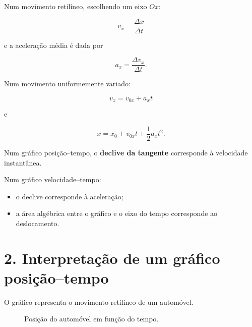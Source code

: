 \documentclass[11pt,a4paper]{article}
\begin{document}
	\begin{recorda}
		
		Num movimento retilíneo, escolhendo um eixo $Ox$:
		
		\[
		v_x=\frac{\Delta x}{\Delta t}
		\]
		
		e a aceleração média é dada por
		
		\[
		a_x=\frac{\Delta v_x}{\Delta t}.
		\]
		
		Num movimento uniformemente variado:
		
		\[
		v_x=v_{0x}+a_x t
		\]
		
		e
		
		\[
		x=x_0+v_{0x}t+\frac{1}{2}a_xt^2.
		\]
		
		Num gráfico posição--tempo, o \textbf{declive da tangente} corresponde à
		velocidade instantânea.
		
		Num gráfico velocidade--tempo:
		
		\begin{itemize}
			\item o declive corresponde à aceleração;
			\item a área algébrica entre o gráfico e o eixo do tempo corresponde
			ao deslocamento.
		\end{itemize}
		
	\end{recorda}
	
	\section*{2. Interpretação de um gráfico posição--tempo}
	
	O gráfico representa o movimento retilíneo de um automóvel.
	
	\begin{figure}[H]
		\centering
		
		
		\caption{Posição do automóvel em função do tempo.}
		
	\end{figure}
	
\end{document}
